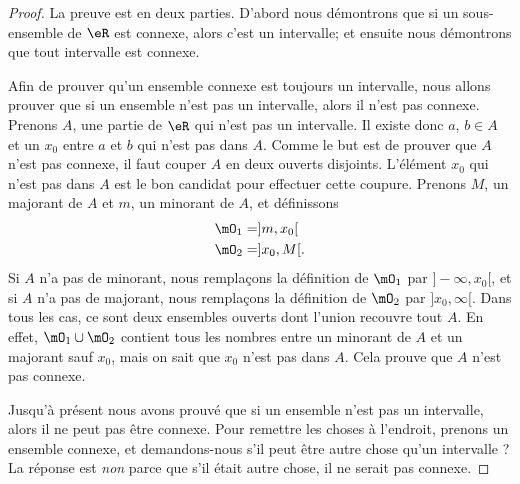 \begin{proof}
    La preuve est en deux parties. D'abord nous démontrons que si un sous-ensemble de $\eR$ est connexe, alors c'est un intervalle; et ensuite nous démontrons que tout intervalle est connexe.

    Afin de prouver qu'un ensemble connexe est toujours un intervalle, nous allons prouver que si un ensemble n'est pas un intervalle, alors il n'est pas connexe. Prenons $A$, une partie de $\eR$ qui n'est pas un intervalle. Il existe donc $a$, $b\in A$ et un $x_0$ entre $a$ et $b$ qui n'est pas dans $A$. Comme le but est de prouver que $A$ n'est pas connexe, il faut couper $A$ en deux ouverts disjoints. L'élément $x_0$ qui n'est pas dans $A$ est le bon candidat pour effectuer cette coupure. Prenons $M$, un majorant de $A$ et $m$, un minorant de $A$, et définissons
    \begin{align*}
        \mO_1&=]m,x_0[\\
        \mO_2&=]x_0,M[.
    \end{align*}
    Si $A$ n'a pas de minorant, nous remplaçons la définition de $\mO_1$ par $]-\infty,x_0[$, et si $A$ n'a pas de majorant, nous remplaçons la définition de $\mO_2$ par $]x_0,\infty[$. Dans tous les cas, ce sont deux ensembles ouverts dont l'union recouvre tout $A$. En effet, $\mO_1\cup \mO_2$ contient tous les nombres entre un minorant de $A$ et un majorant sauf $x_0$, mais on sait que $x_0$ n'est pas dans $A$. Cela prouve que $A$ n'est pas connexe.

    Jusqu'à présent nous avons prouvé que si un ensemble n'est pas un intervalle, alors il ne peut pas être connexe. Pour remettre les choses à l'endroit, prenons un ensemble connexe, et demandons-nous s'il peut être autre chose qu'un intervalle ? La réponse est \emph{non} parce que s'il était autre chose, il ne serait pas connexe.


\end{proof}
